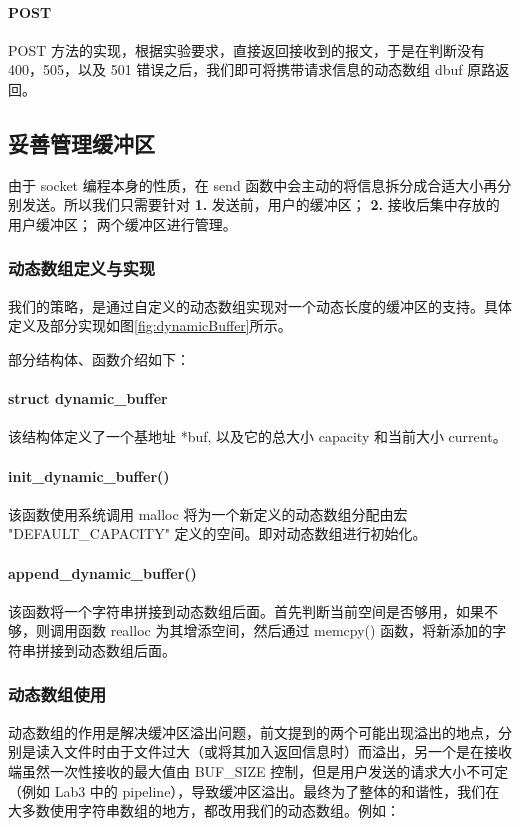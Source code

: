 \paragraph*{POST} POST 方法的实现，根据实验要求，直接返回接收到的报文，于是在判断没有 400，505，以及 501 错误之后，我们即可将携带请求信息的动态数组 dbuf 原路返回。

\subsection{妥善管理缓冲区}

由于 socket 编程本身的性质，在 send 函数中会主动的将信息拆分成合适大小再分别发送。所以我们只需要针对 \textbf{1.} 发送前，用户的缓冲区； \textbf{2.} 接收后集中存放的用户缓冲区； 两个缓冲区进行管理。

\subsubsection{动态数组定义与实现}
我们的策略，是通过自定义的动态数组实现对一个动态长度的缓冲区的支持。具体定义及部分实现如图\ref{fig:dynamicBuffer}所示。


部分结构体、函数介绍如下：

\paragraph*{struct dynamic\_buffer} 该结构体定义了一个基地址 *buf, 以及它的总大小 capacity 和当前大小 current。

\paragraph*{init\_dynamic\_buffer()} 该函数使用系统调用 malloc 将为一个新定义的动态数组分配由宏 "DEFAULT\_CAPACITY" 定义的空间。即对动态数组进行初始化。

\paragraph*{append\_dynamic\_buffer()} 该函数将一个字符串拼接到动态数组后面。首先判断当前空间是否够用，如果不够，则调用函数 realloc 为其增添空间，然后通过 memcpy() 函数，将新添加的字符串拼接到动态数组后面。


\subsubsection{动态数组使用}

动态数组的作用是解决缓冲区溢出问题，前文提到的两个可能出现溢出的地点，分别是读入文件时由于文件过大（或将其加入返回信息时）而溢出，另一个是在接收端虽然一次性接收的最大值由 BUF\_SIZE 控制，但是用户发送的请求大小不可定（例如 Lab3 中的 pipeline），导致缓冲区溢出。最终为了整体的和谐性，我们在大多数使用字符串数组的地方，都改用我们的动态数组。例如：

